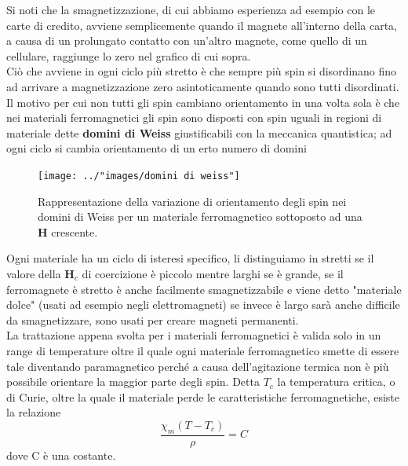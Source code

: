\documentclass[
10pt, %
a4paper, %
oneside, %
headinclude,footinclude, %
BCOR5mm, %
]{scrartcl}
\begin{document}
\FloatBarrier
Si noti che la smagnetizzazione, di cui abbiamo esperienza ad esempio con le carte di credito, avviene semplicemente quando il magnete all'interno della carta, a causa di un prolungato contatto con un'altro magnete, come quello di un cellulare, raggiunge lo zero nel grafico di cui sopra.\\
Ciò che avviene in ogni ciclo più stretto è che sempre più spin si disordinano fino ad arrivare a magnetizzazione zero asintoticamente quando sono tutti disordinati. Il motivo per cui non tutti gli spin cambiano orientamento in una volta sola è che nei materiali ferromagnetici gli spin sono disposti con spin uguali in regioni di materiale dette \textbf{domini di Weiss} giustificabili con la meccanica quantistica; ad ogni ciclo si cambia orientamento di un erto numero di domini
\begin{figure}[h!]
	\centering
	\texttt{[image: ../"images/domini di weiss"]}
	\caption{Rappresentazione della variazione di orientamento degli spin nei domini di Weiss per un materiale ferromagnetico sottoposto ad una \(\mathbf{H}\) crescente.}
	\label{fig:domini-di-weiss}
\end{figure}
\FloatBarrier
Ogni materiale ha un ciclo di isteresi specifico, li distinguiamo in stretti se il valore della \(\mathbf{H}_c\) di coercizione è piccolo mentre larghi se è grande, se il ferromagnete è stretto è anche facilmente smagnetizzabile e viene detto "materiale dolce" (usati ad esempio negli elettromagneti) se invece è largo sarà anche difficile da smagnetizzare, sono usati per creare magneti permanenti.\\
La trattazione appena svolta per i materiali ferromagnetici è valida solo in un range di temperature oltre il quale ogni materiale ferromagnetico smette di essere tale diventando paramagnetico perché a causa dell'agitazione termica non è più possibile orientare la maggior parte degli spin. Detta \(T_c\) la temperatura critica, o di Curie, oltre la quale il materiale perde le caratteristiche ferromagnetiche, esiste la relazione
\[\frac{\chi_m(T-T_c)}{\rho} = C\] 
dove C è una costante. 
\end{document}
